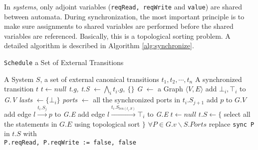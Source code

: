 In \lang{} \emph{systems}, only adjoint variables (\texttt{reqRead, reqWrite} and \texttt{value}) are shared between automata. During synchronization, the most important principle is to make sure assignments to shared variables are performed before the shared variables are referenced. Basically, this is a topological sorting problem. A detailed algorithm is described in Algorithm \ref{alg:synchronize}.

\begin{algorithm}[t]
    \caption{\texttt{Schedule} a Set of External Transitions}
    \label{alg:synchronize}
    \begin{algorithmic}[1]
        \REQUIRE A System $S$, a set of external canonical transitions $t_1,t_2,\cdots,t_n$
        \ENSURE A synchronized transition $t$
            \STATE $t\leftarrow null$
            \RETURN
        \ENDIF
        \STATE \emph{t.g, t.S} $\leftarrow \bigwedge_i t_i.g,\:\{\}$
        \STATE 
        \STATE  \emph{G} $\leftarrow$ a Graph $\langle V,E\rangle$
            \STATE add $\bot_i, \top_i$ to \emph{G.V}
            \STATE \emph{lasts} $\leftarrow\{\bot_i\}$
                \STATE \emph{ports} $\leftarrow$ all the synchronized ports in $t_i.S_{j+1}$
                        \STATE add $p$ to $G.V$
                    \ENDIF
                    \STATE add edge $l \xrightarrow{t_i.S_j} p$ to \emph{G.E}
                \ENDFOR 
            \ENDFOR
                \STATE add edge $l \xrightarrow{t_i.S_{len(t_i.S)}} \top_i$ to \emph{G.E}
            \ENDFOR 
        \ENDFOR
        \STATE
            \STATE $t\leftarrow null$
        \ELSE
            \STATE $t.S\leftarrow\{$ select all the statements in $G.E$ using topological sort $\}$
            \STATE $\forall P\in G.v\backslash S.Ports$ replace \texttt{sync P} in $t.S$ with \\ \hspace{1em} \texttt{P.reqRead, P.reqWrite := false, false}
        \ENDIF
    \end{algorithmic}
\end{algorithm}

